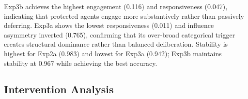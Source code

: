 \begin{table}[t]
\centering
\caption{Process-level diagnostic metrics (mean $\pm$ std).
Higher is better for engagement, responsiveness, influence asymmetry
\emph{inverted} ($1-\hat{I}$), balance, stability, and group welfare.
Best per column in \textbf{bold}.}
\label{tab:process}
\end{table}

Exp3b achieves the highest engagement (0.116) and responsiveness (0.047),
indicating that protected agents engage more substantively rather than
passively deferring.
Exp3a shows the lowest responsiveness (0.011) and influence asymmetry
inverted (0.765), confirming that its over-broad categorical trigger
creates structural dominance rather than balanced deliberation.
Stability is highest for Exp2a (0.983) and lowest for Exp3a (0.942);
Exp3b maintains stability at 0.967 while achieving the best accuracy.

\subsection{Intervention Analysis}

